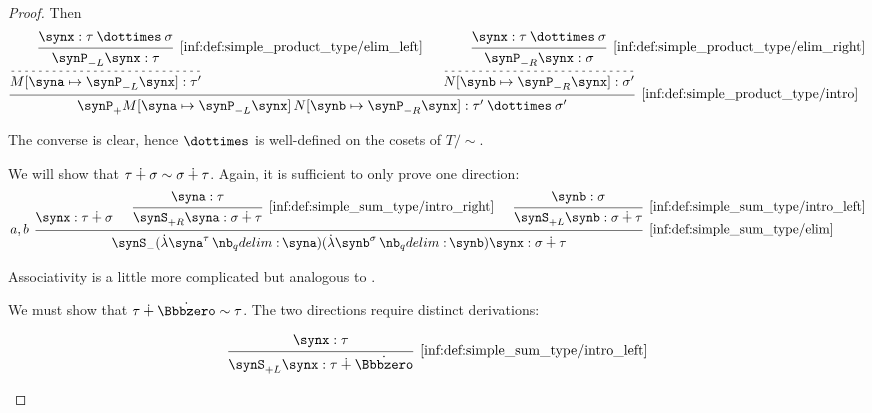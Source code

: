 \begin{proof}
  Then
  \begin{equation*}
    \begin{prooftree}
      \hypo{ \synx: \tau \syntimes \sigma }
      \infer1[\ref{inf:def:simple_product_type/elim_left}]{ \synP_{-L} \synx: \tau }

      \infer[dashed]1{ M[\syna \mapsto \synP_{-L} \synx]: \tau' }

      \hypo{ \synx: \tau \syntimes \sigma }
      \infer1[\ref{inf:def:simple_product_type/elim_right}]{ \synP_{-R} \synx: \sigma }

      \infer[dashed]1{ N[\synb \mapsto \synP_{-R} \synx]: \sigma' }

      \infer2[\ref{inf:def:simple_product_type/intro}]{ \synP_+ M[\syna \mapsto \synP_{-L} \synx] \thinspace N[\synb \mapsto \synP_{-R} \synx]: \tau' \syntimes \sigma' }
    \end{prooftree}
  \end{equation*}

  The converse is clear, hence \( {\syntimes} \) is well-defined on the cosets of \( T / {\sim} \).

   We will show that \( \tau \mathbin{\dotplus} \sigma \sim \sigma \mathbin{\dotplus} \tau \). Again, it is sufficient to only prove one direction:
  \begin{equation*}
    \begin{prooftree}
      \hypo{ \synx: \tau \synplus \sigma }

      \hypo{ \syna: \tau }
      \infer1[\ref{inf:def:simple_sum_type/intro_right}]{ \synS_{+R} \syna: \sigma \synplus \tau }

      \hypo{ \synb: \sigma }
      \infer1[\ref{inf:def:simple_sum_type/intro_left}]{ \synS_{+L} \synb: \sigma \synplus \tau }

      \infer[left label={\( a, b \)}]3[\ref{inf:def:simple_sum_type/elim}]{ \synS_- (\qabs {\syna^\tau} \syna) (\qabs {\synb^{\sigma}} \synb) \synx: \sigma \synplus \tau }
    \end{prooftree}
  \end{equation*}

   Associativity is a little more complicated but analogous to .

   We must show that \( \tau \synplus \syn\Bbbzero \sim \tau \). The two directions require distinct derivations:
  \begin{paracol}{2}
    \begin{leftcolumn}
      \ParacolAlignmentHack
      \begin{equation*}
        \begin{prooftree}
          \hypo{ \synx: \tau }
          \infer1[\ref{inf:def:simple_sum_type/intro_left}]{ \synS_{+L} \synx: \tau \synplus \syn\Bbbzero }
        \end{prooftree}
      \end{equation*}
    \end{leftcolumn}


\end{paracol}
\end{proof}
